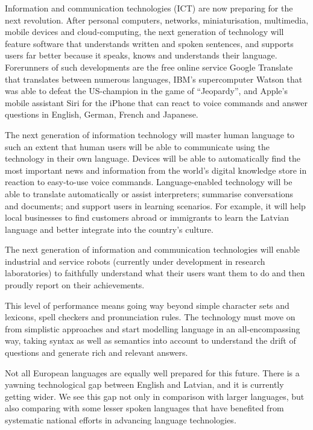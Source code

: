 \begin{multicols}{2}
Information and communication technologies (ICT) are now preparing for the next revolution.
After personal computers, networks, miniaturisation, multimedia, mobile devices and cloud-computing, the next generation of technology will feature software that understands written and spoken sentences, and supports users far better because it speaks, knows and understands their language.
Forerunners of such developments are the free online service Google Translate that translates between numerous languages, IBM’s supercomputer Watson that was able to defeat the US-champion in the game of “Jeopardy”, and Apple’s mobile assistant Siri for the iPhone that can react to voice commands and answer questions in English, German, French and Japanese. 

The next generation of information technology will master human language to such an extent that human users will be able to communicate using the technology in their own language.
Devices will be able to automatically find the most important news and information from the world’s digital knowledge store in reaction to easy-to-use voice commands.
Language-enabled technology will be able to translate automatically or assist interpreters; summarise conversations and documents; and support users in learning scenarios.
For example, it will help local businesses to find customers abroad or immigrants to learn the Latvian language and better integrate into the country’s culture.

The next generation of information and communication technologies will enable industrial and service robots (currently under development in research laboratories) to faithfully understand what their users want them to do and then proudly report on their achievements.  

This level of performance means going way beyond simple character sets and lexicons, spell checkers and pronunciation rules.
The technology must move on from simplistic approaches and start modelling language in an all-encompassing way, taking syntax as well as semantics into account to understand the drift of questions and generate rich and relevant answers.

Not all European languages are equally well prepared for this future.
There is a yawning technological gap between English and Latvian, and it is currently getting wider.
We see this gap not only in comparison with larger languages, but also comparing with some lesser spoken languages that have benefited from systematic national efforts in advancing language technologies. 


\end{multicols}
